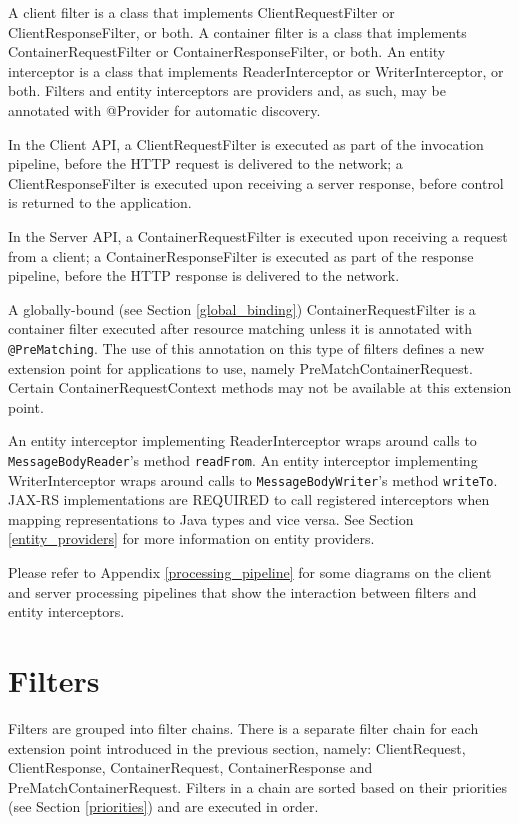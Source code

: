 A client filter is a class that implements ClientRequestFilter or ClientResponseFilter, or both.
\textcolor{highlight green}{A container filter is a class that implements ContainerRequestFilter or
ContainerResponseFilter, or both}. An entity interceptor is a class that implements ReaderInterceptor or
WriterInterceptor, or both. Filters and entity interceptors are providers and, as such, may be annotated with @Provider
for automatic discovery.

In the Client API, a ClientRequestFilter is executed as part of the invocation pipeline, before the HTTP request is
delivered to the network; a ClientResponseFilter is executed upon receiving a server response, before control is
returned to the application.

In the Server API, a ContainerRequestFilter is executed upon receiving a request from a client; a
ContainerResponseFilter is executed as part of the response pipeline, before the HTTP response is delivered to the
network.

A globally-bound (see Section \ref{global_binding}) ContainerRequestFilter is a container filter executed after resource
matching unless it is annotated with \lstinline{@PreMatching}. The use of this annotation on this type of filters
defines a new extension point for applications to use, namely PreMatchContainerRequest. Certain ContainerRequestContext
methods may not be available at this extension point.

An entity interceptor implementing ReaderInterceptor wraps around calls to \lstinline{MessageBodyReader}'s method
\lstinline{readFrom}. An entity interceptor implementing WriterInterceptor wraps around calls to
\lstinline{MessageBodyWriter}'s method \lstinline{writeTo}. JAX-RS implementations are REQUIRED to call registered
interceptors when mapping representations to Java types and vice versa. See Section \ref{entity_providers} for more
information on entity providers.

Please refer to Appendix \ref{processing_pipeline} for some diagrams on the client and server processing pipelines that
show the interaction between filters and entity interceptors.

\section{Filters}
\label{filters}

Filters are grouped into filter chains. There is a separate filter chain for each extension point introduced in the
previous section, namely: ClientRequest, ClientResponse, ContainerRequest, ContainerResponse and
PreMatchContainerRequest. \textcolor{highlight green}{Filters in a chain are sorted based on their priorities} (see
Section \ref{priorities}) and are executed in order.

